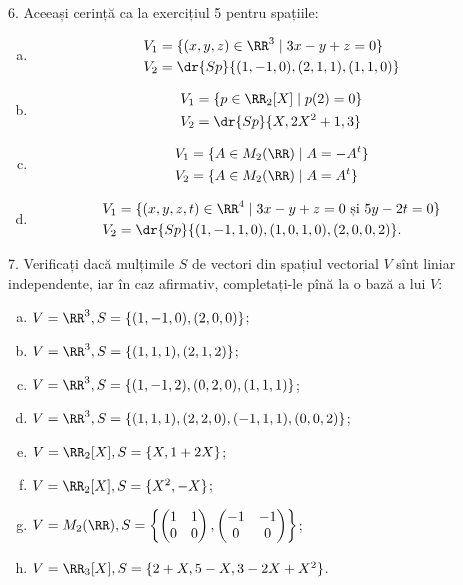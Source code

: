6. Aceeași cerință ca la exercițiul 5 pentru spațiile:
\begin{enumerate}[(a)]
    \item %
        \begin{align*}
            V_1 &= \{ (x, y, z) \in \RR^3 \mid 3x - y + z = 0 \} \\
            V_2 &= \dr{Sp}\{(1, -1, 0), (2, 1, 1), (1, 1, 0) \}
        \end{align*}
    \item %
        \begin{align*}
            V_1 &= \{ p \in \RR_2[X] \mid p(2) = 0 \} \\
            V_2 &= \dr{Sp}\{ X, 2X^2 + 1, 3 \}
        \end{align*}
    \item %
        \begin{align*}
            V_1 &= \{ A \in M_2(\RR) \mid A = -A^t \} \\
            V_2 &= \{ A \in M_2(\RR) \mid A = A^t \}
        \end{align*}
    \item %
        \begin{align*}
            V_1 &= \{ (x, y, z, t) \in \RR^4 \mid 3x - y + z = 0 \text{ și } %
            5y - 2t = 0 \} \\
            V_2 &= \dr{Sp}\{ (1, -1, 1, 0), (1, 0, 1, 0), (2, 0, 0, 2) \}.
        \end{align*}
\end{enumerate}

\vspace{1cm}

7. Verificați dacă mulțimile $ S $ de vectori din spațiul vectorial $ V $
sînt liniar independente, iar în caz afirmativ, completați-le pînă la o bază
a lui $ V $:
\begin{enumerate}[(a)]
    \item $ V = \RR^3, S = \{(1, -1, 0), (2, 0, 0) \} $;
    \item $ V = \RR^3, S = \{(1, 1, 1), (2, 1, 2) \} $;
    \item $ V = \RR^3, S = \{(1, -1, 2), (0, 2, 0), (1, 1, 1) \} $;
    \item $ V = \RR^3, S = \{(1, 1, 1), (2, 2, 0), (-1, 1, 1), (0, 0, 2) \} $;
    \item $ V = \RR_2[X], S = \{ X, 1 + 2X \} $;
    \item $ V = \RR_2[X], S = \{ X^2, -X \} $;
    \item $ V = M_2(\RR), S = \left\{ \begin{pmatrix} 1 & 1 \\ 0 & 0 \end{pmatrix}, %
        \begin{pmatrix} -1 & -1 \\ 0 & 0 \end{pmatrix} \right\} $;
    \item $ V = \RR_3[X], S = \{ 2 + X, 5 - X, 3 - 2X + X^2 \} $.
\end{enumerate}

